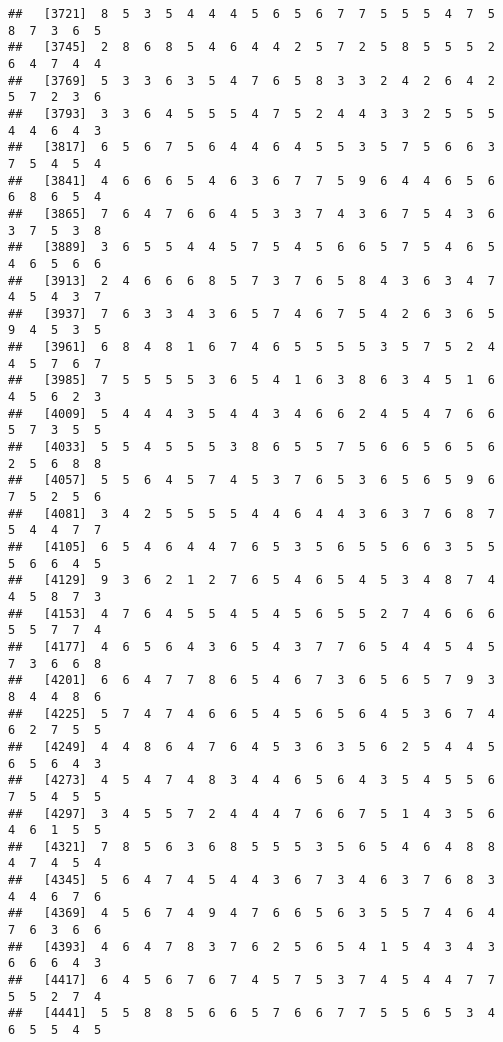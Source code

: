 \documentclass[
]{book}
\begin{document}
\begin{verbatim}
##   [3721]  8  5  3  5  4  4  4  5  6  5  6  7  7  5  5  5  4  7  5  8  7  3  6  5
##   [3745]  2  8  6  8  5  4  6  4  4  2  5  7  2  5  8  5  5  5  2  6  4  7  4  4
##   [3769]  5  3  3  6  3  5  4  7  6  5  8  3  3  2  4  2  6  4  2  5  7  2  3  6
##   [3793]  3  3  6  4  5  5  5  4  7  5  2  4  4  3  3  2  5  5  5  4  4  6  4  3
##   [3817]  6  5  6  7  5  6  4  4  6  4  5  5  3  5  7  5  6  6  3  7  5  4  5  4
##   [3841]  4  6  6  6  5  4  6  3  6  7  7  5  9  6  4  4  6  5  6  6  8  6  5  4
##   [3865]  7  6  4  7  6  6  4  5  3  3  7  4  3  6  7  5  4  3  6  3  7  5  3  8
##   [3889]  3  6  5  5  4  4  5  7  5  4  5  6  6  5  7  5  4  6  5  4  6  5  6  6
##   [3913]  2  4  6  6  6  8  5  7  3  7  6  5  8  4  3  6  3  4  7  4  5  4  3  7
##   [3937]  7  6  3  3  4  3  6  5  7  4  6  7  5  4  2  6  3  6  5  9  4  5  3  5
##   [3961]  6  8  4  8  1  6  7  4  6  5  5  5  5  3  5  7  5  2  4  4  5  7  6  7
##   [3985]  7  5  5  5  5  3  6  5  4  1  6  3  8  6  3  4  5  1  6  4  5  6  2  3
##   [4009]  5  4  4  4  3  5  4  4  3  4  6  6  2  4  5  4  7  6  6  5  7  3  5  5
##   [4033]  5  5  4  5  5  5  3  8  6  5  5  7  5  6  6  5  6  5  6  2  5  6  8  8
##   [4057]  5  5  6  4  5  7  4  5  3  7  6  5  3  6  5  6  5  9  6  7  5  2  5  6
##   [4081]  3  4  2  5  5  5  5  4  4  6  4  4  3  6  3  7  6  8  7  5  4  4  7  7
##   [4105]  6  5  4  6  4  4  7  6  5  3  5  6  5  5  6  6  3  5  5  5  6  6  4  5
##   [4129]  9  3  6  2  1  2  7  6  5  4  6  5  4  5  3  4  8  7  4  4  5  8  7  3
##   [4153]  4  7  6  4  5  5  4  5  4  5  6  5  5  2  7  4  6  6  6  5  5  7  7  4
##   [4177]  4  6  5  6  4  3  6  5  4  3  7  7  6  5  4  4  5  4  5  7  3  6  6  8
##   [4201]  6  6  4  7  7  8  6  5  4  6  7  3  6  5  6  5  7  9  3  8  4  4  8  6
##   [4225]  5  7  4  7  4  6  6  5  4  5  6  5  6  4  5  3  6  7  4  6  2  7  5  5
##   [4249]  4  4  8  6  4  7  6  4  5  3  6  3  5  6  2  5  4  4  5  6  5  6  4  3
##   [4273]  4  5  4  7  4  8  3  4  4  6  5  6  4  3  5  4  5  5  6  7  5  4  5  5
##   [4297]  3  4  5  5  7  2  4  4  4  7  6  6  7  5  1  4  3  5  6  4  6  1  5  5
##   [4321]  7  8  5  6  3  6  8  5  5  5  3  5  6  5  4  6  4  8  8  4  7  4  5  4
##   [4345]  5  6  4  7  4  5  4  4  3  6  7  3  4  6  3  7  6  8  3  4  4  6  7  6
##   [4369]  4  5  6  7  4  9  4  7  6  6  5  6  3  5  5  7  4  6  4  7  6  3  6  6
##   [4393]  4  6  4  7  8  3  7  6  2  5  6  5  4  1  5  4  3  4  3  6  6  6  4  3
##   [4417]  6  4  5  6  7  6  7  4  5  7  5  3  7  4  5  4  4  7  7  5  5  2  7  4
##   [4441]  5  5  8  8  5  6  6  5  7  6  6  7  7  5  5  6  5  3  4  6  5  5  4  5

\end{verbatim}
\end{document}
